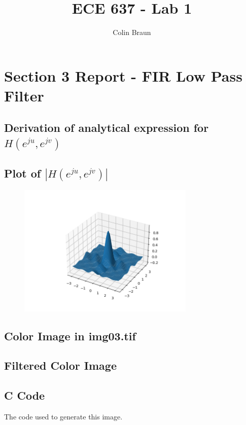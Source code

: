 \documentclass{article}
\title{ECE 637 - Lab 1}
\author{Colin Braun}
\begin{document}
\maketitle

\section{Section 3 Report - FIR Low Pass Filter}
\subsection{Derivation of analytical expression for $H(e^{ju}, e^{jv})$}
\subsection{Plot of $|H(e^{ju}, e^{jv})|$}
\begin{figure}[H]
    \centering
    \includegraphics[width=0.75\textwidth]{../results/section3-python.png}
    \begin{center}
    \end{center}
    \label{fig:A1}
\end{figure}
\subsection{Color Image in img03.tif}
\subsection{Filtered Color Image}
\subsection{C Code}
The code used to generate this image.

\end{document}
